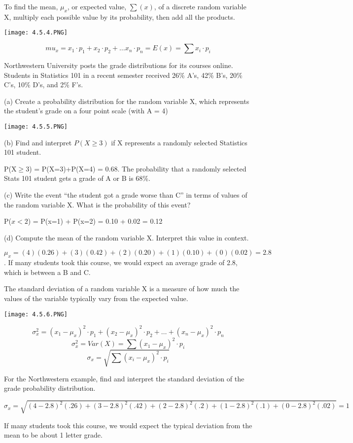 \documentclass[../stats.tex]{subfiles}
\begin{document}
To find the mean, $\mu_x$, or expected value, $\sum(x)$, of a discrete random variable X, multiply each possible value by its probability, then add all the products.
\begin{center}
    \texttt{[image: 4.5.4.PNG]}
\end{center}
\[ mu_x = x_1\cdot p_1+x_2\cdot p_2+\dots x_n\cdot p_n = E(x) = \sum x_i\cdot p_i \]
\begin{example}
    Northwestern University posts the grade distributions for its courses online. Students in Statistics 101 in a recent semester received 26\% A's, 42\% B's, 20\% C's, 10\% D's, and 2\% F's.

    (a) Create a probability distribution for the random variable X, which represents the student's grade on a four point scale (with A = 4)
    \begin{center}
        \texttt{[image: 4.5.5.PNG]}
    \end{center}

    (b) Find and interpret $P(X\geq 3)$ if X represents a randomly selected Statistics 101 student.

    P(X$\geq 3$) = P(X=3)+P(X=4) = 0.68. The probability that a randomly selected Stats 101 student gets a grade of A or B is 68\%.

    (c) Write the event ``the student got a grade worse than C'' in terms of values of the random variable X. What is the probability of this event?

    P($x<2$) = P(x=1) + P(x=2) = 0.10 + 0.02 = 0.12

    (d) Compute the mean of the random variable X. Interpret this value in context.

    $\mu_x = (4)(0.26)+(3)(0.42)+(2)(0.20)+(1)(0.10)+(0)(0.02) = 2.8$. If many students took this course, we would expect an average grade of 2.8, which is between a B and C.
\end{example}

The standard deviation of a random variable X is a measure of how much the values of the variable typically vary from the expected value.
\begin{center}
    \texttt{[image: 4.5.6.PNG]}
\end{center}
\[ \sigma_x^2 = (x_1-\mu_x)^2\cdot p_1+(x_2-\mu_x)^2\cdot p_2+\dots + (x_n-\mu_x)^2\cdot p_n \]
\[ \sigma_x^2 = Var(X)=\sum(x_1-\mu_x)^2\cdot p_i \]
\[ \sigma_x = \sqrt{\sum (x_i-\mu_x)^2\cdot p_i}\]

\begin{example}
    For the Northwestern example, find and interpret the standard deviation of the grade probability distribution.

    $\sigma_x = \sqrt{(4-2.8)^2(.26)+(3-2.8)^2(.42)+(2-2.8)^2(.2)+(1-2.8)^2(.1)+(0-2.8)^2(.02)}=1$

    If many students took this course, we would expect the typical deviation from the mean to be about 1 letter grade.
\end{example}
\end{document}
